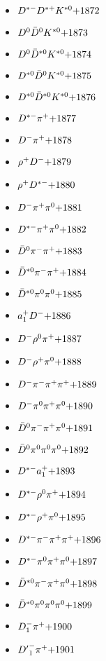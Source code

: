 \begin{multicols}{3}
\begin{itemize}
 \item $ D^{*-} D^{*+} K^{*0} \hfill{+1872}$
 \item $ D^{0} \bar{D}^{0} K^{*0} \hfill{+1873}$
 \item $ D^{0} \bar{D}^{*0} K^{*0} \hfill{+1874}$
 \item $ D^{*0} \bar{D}^{0} K^{*0} \hfill{+1875}$
 \item $ D^{*0} \bar{D}^{*0} K^{*0} \hfill{+1876}$
 \item $ D^{*-} \pi^{+} \hfill{+1877}$
 \item $ D^{-} \pi^{+} \hfill{+1878}$
 \item $ \rho^{+} D^{-} \hfill{+1879}$
 \item $ \rho^{+} D^{*-} \hfill{+1880}$
 \item $ D^{-} \pi^{+} \pi^{0} \hfill{+1881}$
 \item $ D^{*-} \pi^{+} \pi^{0} \hfill{+1882}$
 \item $ \bar{D}^{0} \pi^{-} \pi^{+} \hfill{+1883}$
 \item $ \bar{D}^{*0} \pi^{-} \pi^{+} \hfill{+1884}$
 \item $ \bar{D}^{*0} \pi^{0} \pi^{0} \hfill{+1885}$
 \item $ a_{1}^{+} D^{-} \hfill{+1886}$
 \item $ D^{-} \rho^{0} \pi^{+} \hfill{+1887}$
 \item $ D^{-} \rho^{+} \pi^{0} \hfill{+1888}$
 \item $ D^{-} \pi^{-} \pi^{+} \pi^{+} \hfill{+1889}$
 \item $ D^{-} \pi^{0} \pi^{+} \pi^{0} \hfill{+1890}$
 \item $ \bar{D}^{0} \pi^{-} \pi^{+} \pi^{0} \hfill{+1891}$
 \item $ \bar{D}^{0} \pi^{0} \pi^{0} \pi^{0} \hfill{+1892}$
 \item $ D^{*-} a_{1}^{+} \hfill{+1893}$
 \item $ D^{*-} \rho^{0} \pi^{+} \hfill{+1894}$
 \item $ D^{*-} \rho^{+} \pi^{0} \hfill{+1895}$
 \item $ D^{*-} \pi^{-} \pi^{+} \pi^{+} \hfill{+1896}$
 \item $ D^{*-} \pi^{0} \pi^{+} \pi^{0} \hfill{+1897}$
 \item $ \bar{D}^{*0} \pi^{-} \pi^{+} \pi^{0} \hfill{+1898}$
 \item $ \bar{D}^{*0} \pi^{0} \pi^{0} \pi^{0} \hfill{+1899}$
 \item $ D_{1}^{-} \pi^{+} \hfill{+1900}$
 \item $ {D^{\prime}}_{1}^{-} \pi^{+} \hfill{+1901}$

\end{itemize}
\end{multicols}
